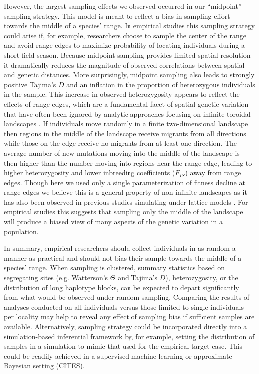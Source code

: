 \documentclass[11pt,twoside,lineno]{preprint}
\begin{document}
However, the largest sampling effects we observed occurred in our ``midpoint'' sampling strategy. This model is meant to reflect a bias in sampling effort towards the middle of a species' range. In empirical studies this sampling strategy could arise if, for example, researchers choose to sample the center of the range and avoid range edges to maximize probability of locating individuals during a short field season. Because midpoint sampling provides limited spatial resolution it dramatically reduces the magnitude of observed correlations between spatial and genetic distances. More surprisingly, midpoint sampling also leads to strongly positive Tajima's $D$ and an inflation in the proportion of heterozygous individuals in the sample. This increase in observed heterozygosity appears to reflect the effects of range edges, which are a fundamental facet of spatial genetic variation that have often been ignored by analytic approaches focusing on infinite toroidal landscapes \citep{Felsenstein1975}. If individuals move randomly in a finite two-dimensional landscape then regions in the middle of the landscape receive migrants from all directions while those on the edge receive no migrants from at least one direction. The average number of new mutations moving into the middle of the landscape is then higher than the number moving into regions near the range edge, leading to higher heterozygosity and lower inbreeding coefficients ($F_{IS}$) away from range edges. Though here we used only a single parameterization of fitness decline at range edges we believe this is a general property of non-infinite landscapes as it has also been observed in previous studies simulating under lattice models \citep{Neel2013,Shirk2014}. For empirical studies this suggests that sampling only the middle of the landscape will produce a biased view of many aspects of the genetic variation in a population. 

In summary, empirical researchers should collect individuals in as random a manner as practical and should not bias their sample towards the middle of a species' range. When sampling is clustered, summary statistics based on segregating sites (e.g. Watterson's $\Theta$ and Tajima's $D$), heterozygosity, or the distribution of long haplotype blocks, can be expected to depart significantly from what would be observed under random sampling. Comparing the results of analyses conducted on all individuals versus those limited to single individuals per locality may help to reveal any effect of sampling bias if sufficient samples are available. Alternatively, sampling strategy could be incorporated directly into a simulation-based inferential framework by, for example, setting the  distribution of samples in a simulation to mimic that used for the empirical target case. This could be readily achieved in a supervised machine learning or approximate Bayesian setting (CITES).
\end{document}
